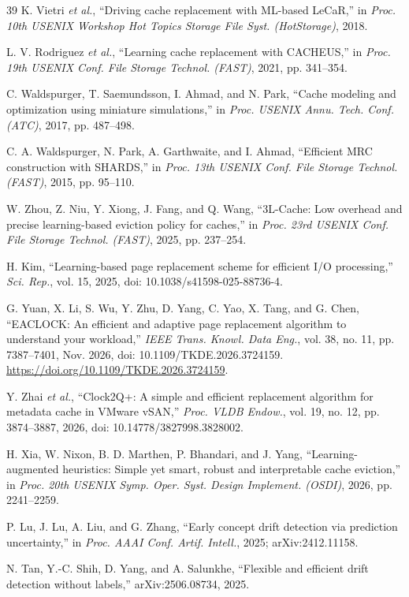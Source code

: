 \documentclass[10pt,twocolumn,a4paper]{IEEEtran}
\begin{document}
\begin{thebibliography}{39}
 K. Vietri \emph{et al.}, ``Driving cache replacement with
ML-based LeCaR,'' in \emph{Proc. 10th USENIX Workshop Hot Topics Storage File
Syst. (HotStorage)}, 2018.

 L. V. Rodriguez \emph{et al.}, ``Learning cache replacement
with CACHEUS,'' in \emph{Proc. 19th USENIX Conf. File Storage Technol. (FAST)},
2021, pp. 341--354.

 C. Waldspurger, T. Saemundsson, I. Ahmad, and N. Park, ``Cache
modeling and optimization using miniature simulations,'' in \emph{Proc. USENIX
Annu. Tech. Conf. (ATC)}, 2017, pp. 487--498.

 C. A. Waldspurger, N. Park, A. Garthwaite, and I. Ahmad,
``Efficient MRC construction with SHARDS,'' in \emph{Proc. 13th USENIX Conf.
File Storage Technol. (FAST)}, 2015, pp. 95--110.

 W. Zhou, Z. Niu, Y. Xiong, J. Fang, and Q. Wang, ``3L-Cache:
Low overhead and precise learning-based eviction policy for caches,'' in
\emph{Proc. 23rd USENIX Conf. File Storage Technol. (FAST)}, 2025, pp.
237--254.

 H. Kim, ``Learning-based page replacement scheme for efficient
I/O processing,'' \emph{Sci. Rep.}, vol. 15, 2025, doi:
10.1038/s41598-025-88736-4.

 G. Yuan, X. Li, S. Wu, Y. Zhu, D. Yang, C. Yao, X. Tang, and G.
Chen, ``EACLOCK: An efficient and adaptive page replacement algorithm to
understand your workload,'' \emph{IEEE Trans. Knowl. Data Eng.}, vol. 38,
no. 11, pp. 7387--7401, Nov. 2026, doi: 10.1109/TKDE.2026.3724159.
\url{https://doi.org/10.1109/TKDE.2026.3724159}.

 Y. Zhai \emph{et al.}, ``Clock2Q+: A simple and efficient
replacement algorithm for metadata cache in VMware vSAN,'' \emph{Proc. VLDB
Endow.}, vol. 19, no. 12, pp. 3874--3887, 2026, doi: 10.14778/3827998.3828002.

 H. Xia, W. Nixon, B. D. Marthen, P. Bhandari, and J. Yang,
``Learning-augmented heuristics: Simple yet smart, robust and interpretable
cache eviction,'' in \emph{Proc. 20th USENIX Symp. Oper. Syst. Design Implement.
(OSDI)}, 2026, pp. 2241--2259.

 P. Lu, J. Lu, A. Liu, and G. Zhang, ``Early concept drift
detection via prediction uncertainty,'' in \emph{Proc. AAAI Conf. Artif.
Intell.}, 2025; arXiv:2412.11158.

 N. Tan, Y.-C. Shih, D. Yang, and A. Salunkhe, ``Flexible and
efficient drift detection without labels,'' arXiv:2506.08734, 2025.


\end{thebibliography}
\end{document}
